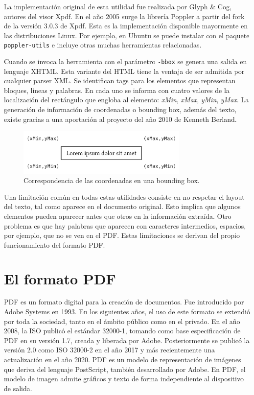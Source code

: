 La implementación original de esta utilidad fue realizada por Glyph \& Cog, autores del visor Xpdf. En el año 2005 surge la librería Poppler a partir del fork de la versión 3.0.3 de Xpdf. Esta es la implementación disponible mayormente en las distribuciones Linux. Por ejemplo, en Ubuntu se puede instalar con el paquete \verb|poppler-utils| e incluye otras muchas herramientas relacionadas.

Cuando se invoca la herramienta con el parámetro \verb|-bbox| se genera una salida en lenguaje XHTML. Esta variante del HTML tiene la ventaja de ser admitida por cualquier parser XML. Se identifican tags para los elementos que representan bloques, lineas y palabras. En cada uno se informa con cuatro valores de la localización del rectángulo que engloba al elemento: \emph{xMin}, \emph{xMax}, \emph{yMin}, \emph{yMax}. La generación de información de coordenadas o bounding box, además del texto, existe gracias a una aportación al proyecto del año 2010 de Kenneth Berland. 

\begin{figure}[hp!]
    \centering
    \includegraphics[width=0.75\textwidth]{imaxes/c-bases-teoricas/correspondencia-coordenadas-bounding.png}
    \caption{Correspondencia de las coordenadas en una bounding box.}
    \label{fig:bounding-box}
\end{figure}

Una limitación común en todas estas utilidades consiste en no respetar el layout del texto, tal como aparece en el documento original. Esto implica que algunos elementos pueden aparecer antes que otros en la información extraída. Otro problema es que hay palabras que aparecen con caracteres intermedios, espacios, por ejemplo, que no se ven en el PDF. Estas limitaciones se derivan del propio funcionamiento del formato PDF.

\section{El formato PDF}

PDF es un formato digital para la creación de documentos. Fue introducido por Adobe Systems en 1993. En los siguientes años, el uso de este formato se extendió por toda la sociedad, tanto en el ámbito público como en el privado. En el año 2008, la ISO publicó el estándar 32000-1, tomando como base especificación de PDF en su versión 1.7, creada y liberada por Adobe. Posteriormente se publicó la versión 2.0 como ISO 32000-2 en el año 2017 y más recientemente una actualización en el año 2020. PDF es un modelo de representación de imágenes que deriva del lenguaje PostScript, también desarrollado por Adobe. En PDF, el modelo de imagen admite gráficos y texto de forma independiente al dispositivo de salida. 

